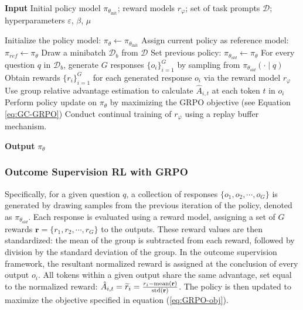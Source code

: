 \begin{itemize}[topsep=0pt]
\begin{itemize}[topsep=0pt]
\begin{algorithm}[t]
  \small
  \caption{Iterative Group Relative Policy Optimization}
  \textbf{Input} Initial policy model $\pi_{\theta_{\text{init}}}$; reward models $r_\varphi$; set of task prompts $\mathcal{D}$; 
  hyperparameters $\varepsilon$, $\beta$, $\mu$
  \begin{algorithmic}[1]
    \State Initialize the policy model: $\pi_\theta \leftarrow \pi_{\theta_{\text{init}}}$
       \State Assign current policy as reference model: $\pi_{ref} \leftarrow \pi_{\theta}$
      \State Draw a minibatch $\mathcal{D}_b$ from $\mathcal{D}$
      \State Set previous policy: $\pi_{\theta_{old}} \leftarrow \pi_{\theta}$ 
      \State For every question $q$ in $\mathcal{D}_b$, generate $G$ responses $\{o_i\}_{i=1}^G$ by sampling from $\pi_{\theta_{old}} (\cdot \mid q) $
      \State Obtain rewards $\{r_i\}_{i=1}^{G}$ for each generated response $o_i$ via the reward model $r_{\varphi}$ 
      \State Use group relative advantage estimation to calculate $\hat{A}_{i,t}$ at each token $t$ in $o_i$
        \State Perform policy update on $\pi_{\theta}$ by maximizing the GRPO objective (see Equation \ref{eq:GC-GRPO})
      \EndFor
    \EndFor 
    \State Conduct continual training of $r_\varphi$ using a replay buffer mechanism.
    \EndFor 
  \end{algorithmic}
  \textbf{Output} $\pi_\theta$
  \label{alg:iter-grpo}
\end{algorithm}

\subsubsection{Outcome Supervision RL with GRPO} Specifically, for a given question $q$, a collection of responses $\{o_1, o_2, \cdots, o_G\}$ is generated by drawing samples from the previous iteration of the policy, denoted as $\pi_{\theta_{old}}$. Each response is evaluated using a reward model, assigning a set of $G$ rewards $\mathbf{r}=\{r_1, r_2, \cdots, r_G\}$ to the outputs. These reward values are then standardized: the mean of the group is subtracted from each reward, followed by division by the standard deviation of the group. In the outcome supervision framework, the resultant normalized reward is assigned at the conclusion of every output $o_i$. All tokens within a given output share the same advantage, set equal to the normalized reward: $\hat{A}_{i, t} = \widetilde{r}_i = \frac{r_i- {\rm mean}(\mathbf{r})}{{\rm std}(\mathbf{r})}$. The policy is then updated to maximize the objective specified in equation (\ref{eq:GRPO-obj}).


\end{itemize}
\end{itemize}
